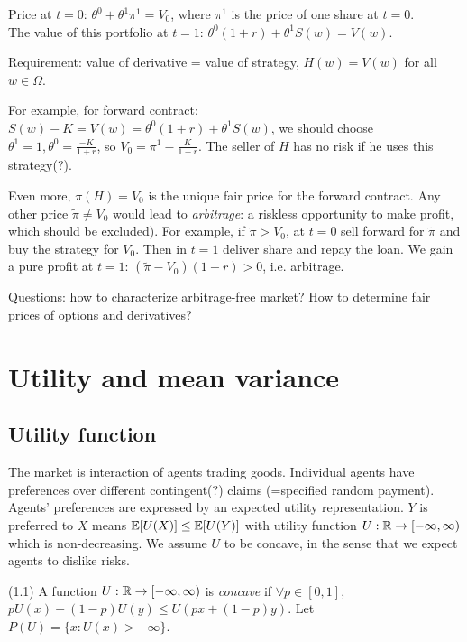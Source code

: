 \documentclass[a4paper]{article}
\begin{document}
Price at $t=0$: $\theta^0+\theta^1 \pi^1 = V_0$, where $\pi^1$ is the price of one share at $t=0$.\\
The value of this portfolio at $t=1$: $\theta^0(1+r) + \theta^1 S(w) = V(w)$.

Requirement: value of derivative = value of strategy, $H(w) = V(w)$ for all $w \in \Omega$.

For example, for forward contract: $S(w)-K = V(w) = \theta^0(1+r)+\theta^1 S(w)$, we should choose $\theta^1 = 1,\theta^0=\frac{-K}{1+r}$, so $V_0 = \pi^1 - \frac{K}{1+r}$. The seller of $H$ has no risk if he uses this strategy(?).

Even more, $\pi(H)=V_0$ is the unique fair price for the forward contract. Any other price $\tilde{\pi} \neq V_0$ would lead to \emph{arbitrage}: a riskless opportunity to make profit, which should be excluded). For example, if $\tilde{\pi} > V_0$, at $t=0$ sell forward for $\tilde{\pi}$ and buy the strategy for $V_0$. Then in $t=1$ deliver share and repay the loan. We gain a pure profit at $t=1$: $(\tilde{\pi}-V_0) (1+r)>0$, i.e. arbitrage.

Questions: how to characterize arbitrage-free market? How to determine fair prices of options and derivatives?

\newpage

\section{Utility and mean variance}
\subsection{Utility function}

The market is interaction of agents trading goods. Individual agents have preferences over different contingent(?) claims (=specified random payment). Agents' preferences are expressed by an expected utility representation. $Y$ is preferred to $X$ means $\mathbb{E}[U(X)] \leq \mathbb{E}[U(Y)]$ with utility function $U: \mathbb{R} \to [-\infty,\infty)$ which is non-decreasing. We assume $U$ to be concave, in the sense that we expect agents to dislike risks.

\begin{defi} 
(1.1) A function $U:\mathbb{R} \to [-\infty,\infty)$ is \emph{concave} if $\forall p \in [0,1]$, $pU(x) + (1-p) U(y) \leq U(px+(1-p)y)$. Let $P(U) = \{x: U(x)>-\infty\}$.
\end{defi}
\end{document}
